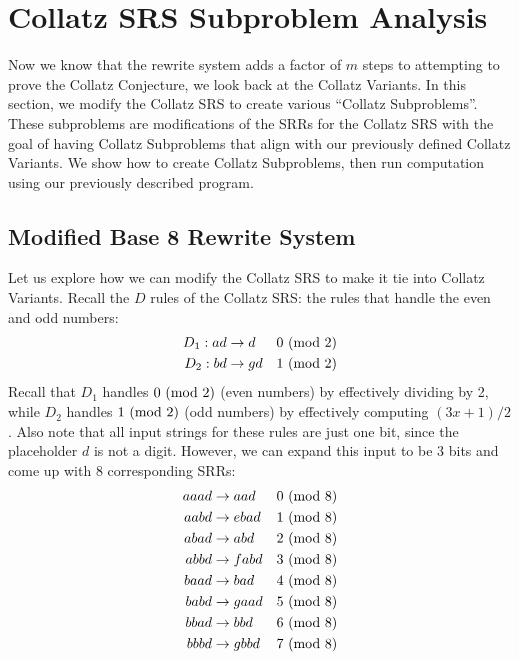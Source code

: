 \section{Collatz SRS Subproblem Analysis} \label{subsec:collatzsubproblemananalysis}
Now we know that the rewrite system adds a factor of $m$ steps to attempting to prove the Collatz Conjecture, we look back at the Collatz Variants. In this section, we modify the Collatz SRS to create various ``Collatz Subproblems''. These subproblems are modifications of the SRRs for the Collatz SRS with the goal of having Collatz Subproblems that align with our previously defined Collatz Variants. We show how to create Collatz Subproblems, then run computation using our previously described program.
\subsection{Modified Base 8 Rewrite System} \label{subsec:base8rewrite}
Let us explore how we can modify the Collatz SRS to make it tie into Collatz Variants. Recall the $D$ rules of the Collatz SRS: the rules that handle the even and odd numbers:
\begin{align*}
    D_1: ad &\rightarrow d &\text{$0\ (\mathrm{mod}\ 2)$}\\
    D_2: bd &\rightarrow gd &\text{$1\ (\mathrm{mod}\ 2)$}\\
\end{align*}
Recall that $D_1$ handles $0 \ (\mathrm{mod}\ 2)$ (even numbers) by effectively dividing by 2, while $D_2$ handles $1 \ (\mathrm{mod}\ 2)$ (odd numbers)  by effectively computing $(3x+1)/2$. Also note that all input strings for these rules are just one bit, since the placeholder $d$ is not a digit. However, we can expand this input to be 3 bits and come up with 8 corresponding SRRs:
\begin{align*}
    aaad &\rightarrow aad &\text{$0\ (\mathrm{mod}\ 8)$}\\
    aabd &\rightarrow ebad &\text{$1\ (\mathrm{mod}\ 8)$}\\
    abad &\rightarrow abd &\text{$2\ (\mathrm{mod}\ 8)$}\\
    abbd &\rightarrow fabd &\text{$3\ (\mathrm{mod}\ 8)$}\\
    baad &\rightarrow bad &\text{$4\ (\mathrm{mod}\ 8)$}\\
    babd &\rightarrow gaad &\text{$5\ (\mathrm{mod}\ 8)$}\\
    bbad &\rightarrow bbd &\text{$6\ (\mathrm{mod}\ 8)$}\\
    bbbd &\rightarrow gbbd &\text{$7\ (\mathrm{mod}\ 8)$}
\end{align*}
